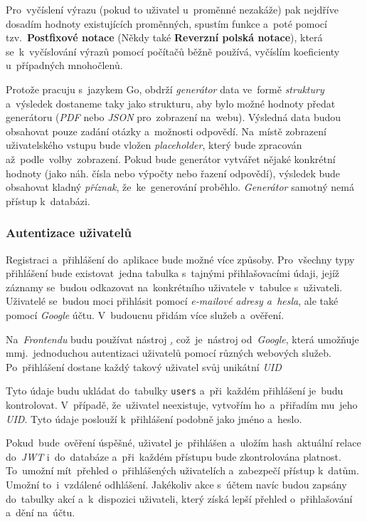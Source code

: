\documentclass[10pt,a4paper]{article}
\begin{document}
            Pro~vyčíslení výrazu (pokud to uživatel u~proměnné nezakáže) pak nejdříve dosadím hodnoty existujících proměnných, spustím funkce a~poté pomocí tzv.~\textbf{Postfixové notace} (Někdy také \textbf{Reverzní polská notace}), která se~k~vyčíslování výrazů pomocí počítačů běžně používá, vyčíslím koeficienty u~případných mnohočlenů. \cite{postfixnotation}

            Protože pracuju s~jazykem Go, obdrží \emph{generátor} data ve~formě \emph{struktury} a~výsledek dostaneme taky jako strukturu, aby bylo možné hodnoty předat generátoru (\emph{PDF} nebo \emph{JSON} pro~zobrazení na~webu). Výsledná data budou obsahovat pouze zadání otázky a~možnosti odpovědí. Na~místě zobrazení uživatelského vstupu bude vložen \emph{placeholder}, který bude zpracován až~podle~volby~zobrazení. Pokud bude generátor vytvářet nějaké konkrétní hodnoty (jako náh. čísla nebo výpočty nebo řazení odpovědí), výsledek bude obsahovat kladný \emph{příznak}, že~ke~generování proběhlo. \emph{Generátor} samotný nemá přístup k~databázi.

        \subsubsection{Autentizace uživatelů}
            Registraci a~přihlášení do~aplikace bude možné více způsoby. Pro~všechny typy přihlášení bude existovat~jedna tabulka s~tajnými přihlašovacími údaji, jejíž záznamy se~budou odkazovat na~konkrétního uživatele v~tabulce s~uživateli. Uživatelé se~budou moci přihlásit pomocí \emph{e-mailové adresy a~hesla}, ale také pomocí \emph{Google} účtu. V~budoucnu přidám více služeb a~ověření.
            
            Na~\emph{Frontendu} budu používat nástroj \href{Firebase}, což~je~nástroj od~\emph{Google}, která umožňuje mmj.~jednoduchou autentizaci uživatelů pomocí různých webových služeb. Po~přihlášení dostane každý takový uživatel svůj unikátní \emph{UID}
            
            Tyto údaje budu ukládat do~tabulky \texttt{users} a~při~každém přihlášení je~budu kontrolovat. V~případě, že~uživatel neexistuje, vytvořím ho~a~přiřadím mu~jeho \emph{UID}. Tyto údaje poslouží k~přihlášení podobně jako jméno a~heslo.
            
            Pokud~bude~ověření úspěšné, uživatel je~přihlášen a~uložím hash~aktuální relace do~\emph{JWT} i~do~databáze a~při~každém přístupu bude zkontrolována platnost. To~umožní mít~přehled o~přihlášených uživatelích a~zabezpečí přístup k~datům. Umožní to~i~vzdálené odhlášení. Jakékoliv akce s~účtem navíc budou zapsány do~tabulky akcí a~k~dispozici uživateli, který získá lepší přehled o~přihlašování a~dění na~účtu.
\end{document}
